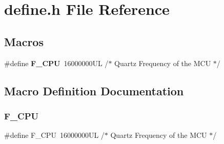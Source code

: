 \section{define.\+h File Reference}
\label{define_8h}
\subsection*{Macros}
\begin{DoxyCompactItemize}
\item 
\#define \textbf{ F\+\_\+\+C\+PU}~16000000\+U\+L /$\ast$ Quartz Frequency of the M\+C\+U $\ast$/
\end{DoxyCompactItemize}


\subsection{Macro Definition Documentation}
\mbox{\label{define_8h_a43bafb28b29491ec7f871319b5a3b2f8}} 
\subsubsection{F\+\_\+\+C\+PU}
{\footnotesize\ttfamily \#define F\+\_\+\+C\+PU~16000000\+U\+L /$\ast$ Quartz Frequency of the M\+C\+U $\ast$/}

